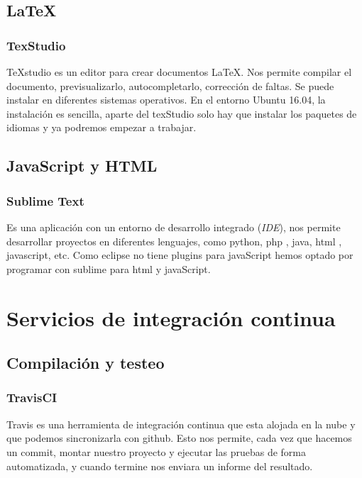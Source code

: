 \subsection{LaTeX}\label{latex}

\subsubsection{TexStudio}\label{texstudio}

TeXstudio es un editor para crear documentos LaTeX. Nos permite compilar el documento, previsualizarlo, autocompletarlo, corrección de faltas. Se puede instalar en diferentes sistemas operativos. En el entorno Ubuntu 16.04, la instalación es sencilla, aparte del texStudio solo hay que instalar los paquetes de idiomas y ya podremos empezar a trabajar. \cite{web:texstudio}

\subsection{JavaScript y HTML}\label{javascript-y-html}

\subsubsection{Sublime Text}\label{sublime-text}

Es una aplicación con un entorno de desarrollo integrado (\emph{IDE}), nos permite desarrollar proyectos en diferentes lenguajes, como python, php , java, html , javascript, etc. Como eclipse no tiene plugins para javaScript hemos optado por programar con sublime para html y javaScript. \cite{web:sublime}

\section{Servicios de integración
	continua}\label{servicios-de-integraciuxf3n-continua}

\subsection{Compilación y testeo}\label{compilacion-y-testeo}

\subsubsection{TravisCI}\label{travis-ci}

Travis es una herramienta de integración continua que esta alojada en la nube y que podemos sincronizarla con github. Esto nos permite, cada vez que hacemos un commit, montar nuestro proyecto y ejecutar las pruebas de forma automatizada, y cuando termine nos enviara un informe del resultado. \cite{web:travis}


